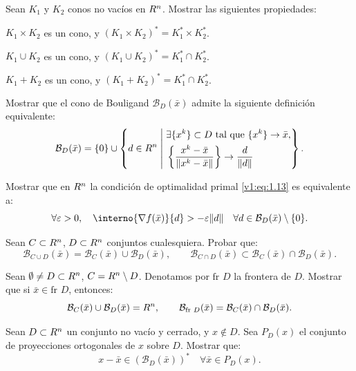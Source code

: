 \begin{exercise}\label{v1:ejer:1.19}
 Sean $K_1$ y $K_2$ conos no vacíos en $R^n$. Mostrar las siguientes propiedades:
 \begin{enuthm}
 \item $K_1 \times K_2$ es un cono, y $(K_1 \times K_2)^* = K_1^* \times K_2^*$.
 \item $K_1 \cup K_2$ es un cono, y $(K_1 \cup K_2)^* = K_1^* \cap K_2^*$.
 \item $K_1 + K_2$ es un cono, y $(K_1 + K_2)^* = K_1^* \cap K_2^*$.
 \end{enuthm}
\end{exercise}

\begin{exercise}\label{v1:ejer:1.20}
 Mostrar que el cono de Bouligand $\mathcal{B}_D(\bar{x})$ admite la siguiente definición equivalente:
 \[
 \mathcal{B}_D(\bar{x}) = \{0\} \cup \left\{ d \in R^n \;\middle|\; \begin{aligned} &\exists \{x^k\} \subset D \text{ tal que } \{x^k\} \to \bar{x}, \\ &\left\{ \frac{x^k - \bar{x}}{\lVert x^k - \bar{x}\rVert} \right\} \to \frac{d}{\lVert d\rVert} \end{aligned} \right\}.
 \]
\end{exercise}

\begin{exercise}\label{v1:ejer:1.21}
 Mostrar que en $R^n$ la condición de optimalidad primal \eqref{v1:eq:1.13} es equivalente a:
 \[
 \forall \varepsilon > 0, \quad \interno{\nabla f(\bar{x})}{d} > -\varepsilon \norm{d} \quad \forall d \in \mathcal{B}_D(\bar{x}) \setminus \{0\}.
 \]
\end{exercise}

\begin{exercise}\label{v1:ejer:1.22}
 Sean $C \subset R^n$, $D \subset R^n$ conjuntos cualesquiera. Probar que:
 \[
 \mathcal{B}_{C \cup D}(\bar{x}) = \mathcal{B}_C(\bar{x}) \cup \mathcal{B}_D(\bar{x}), \qquad
 \mathcal{B}_{C \cap D}(\bar{x}) \subset \mathcal{B}_C(\bar{x}) \cap \mathcal{B}_D(\bar{x}).
 \]
\end{exercise}

\begin{exercise}\label{v1:ejer:1.23}
 Sean $\emptyset \neq D \subset R^n$, $C = R^n \setminus D$. Denotamos por $\text{fr } D$ la frontera de $D$. Mostrar que si $\bar{x} \in \text{fr } D$, entonces:
 \[
 \mathcal{B}_C(\bar{x}) \cup \mathcal{B}_D(\bar{x}) = R^n, \qquad
 \mathcal{B}_{\text{fr } D}(\bar{x}) = \mathcal{B}_C(\bar{x}) \cap \mathcal{B}_D(\bar{x}).
 \]
\end{exercise}

\begin{exercise}\label{v1:ejer:1.24}
 Sean $D \subset R^n$ un conjunto no vacío y cerrado, y $x \notin D$. Sea $P_D(x)$ el conjunto de proyecciones ortogonales de $x$ sobre $D$. Mostrar que:
 \[
 x - \bar{x} \in (\mathcal{B}_D(\bar{x}))^* \quad \forall \bar{x} \in P_D(x).
 \]
\end{exercise}

